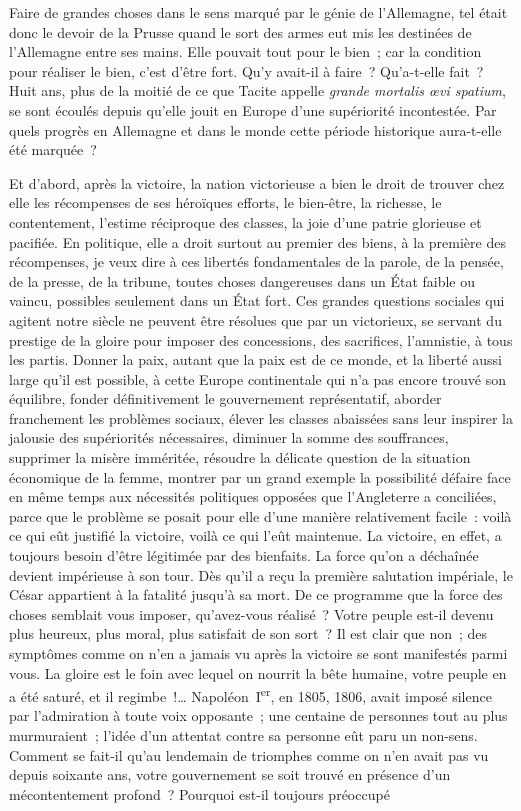 \documentclass[french,twoside]{book} %
\newcommand\orgName[1]{#1}
\newcommand\persName[1]{#1}
\newcommand\placeName[1]{#1}
\begin{document}
Faire de grandes choses dans le sens marqué par le génie de l’{\orgName Allemagne}, tel était donc le devoir de la {\orgName Prusse} quand le sort des armes eut mis les destinées de l’{\orgName Allemagne} entre ses mains. Elle pouvait tout pour le bien ; car la condition pour réaliser le bien, c’est d’être fort. Qu’y avait-il à faire ? Qu’a-t-elle fait ? Huit ans, plus de la moitié de ce que {\persName Tacite} appelle \emph{grande mortalis œvi spatium}, se sont écoulés depuis qu’elle jouit en {\placeName Europe} d’une supériorité incontestée. Par quels progrès en {\placeName Allemagne} et dans le monde cette période historique aura-t-elle été marquée ?\par
Et d’abord, après la victoire, la nation victorieuse a bien le droit de trouver chez elle les récompenses de ses héroïques efforts, le bien-être, la richesse, le contentement, l’estime réciproque des classes, la joie d’une patrie glorieuse et pacifiée. En politique, elle a droit surtout au premier des biens, à la première des récompenses, je veux dire à ces libertés fondamentales de la parole, de la pensée, de la presse, de la tribune, toutes choses dangereuses dans un État faible ou vaincu, possibles seulement dans un État fort. Ces grandes questions sociales qui agitent notre siècle ne peuvent être résolues que par un victorieux, se servant du prestige de la gloire pour imposer des concessions, des sacrifices, l’amnistie, à tous les partis. Donner la paix, autant que la paix est de ce monde, et la liberté aussi large qu’il est possible, à cette Europe continentale qui n’a pas encore trouvé son équilibre, fonder définitivement le gouvernement représentatif, aborder franchement les problèmes sociaux, élever les classes abaissées sans leur inspirer la jalousie des supériorités nécessaires, diminuer la somme des souffrances, supprimer la misère imméritée, résoudre la délicate question de la situation économique de la femme, montrer par un grand exemple la possibilité défaire face en même temps aux nécessités politiques opposées que l’{\orgName Angleterre} a conciliées, parce que le problème se posait pour elle d’une manière relativement facile : voilà ce qui eût justifié la victoire, voilà ce qui l’eût maintenue. La victoire, en effet, a toujours besoin d’être légitimée par des bienfaits. La force qu’on a déchaînée devient impérieuse à son tour. Dès qu’il a reçu la première salutation impériale, le César appartient à la fatalité jusqu’à sa mort. De ce programme que la force des choses semblait vous imposer, qu’avez-vous réalisé ? Votre peuple est-il devenu plus heureux, plus moral, plus satisfait de son sort ? Il est clair que non ; des symptômes comme on n’en a jamais vu après la victoire se sont manifestés parmi vous. La gloire est le foin avec lequel on nourrit la bête humaine, votre peuple en a été saturé, et il regimbe !… {\persName Napoléon I\textsuperscript{er}}, en 1805, 1806, avait imposé silence par l’admiration à toute voix opposante ; une centaine de personnes tout au plus murmuraient ; l’idée d’un attentat contre sa personne eût paru un non-sens. Comment se fait-il qu’au lendemain de triomphes comme on n’en avait pas vu depuis soixante ans, votre gouvernement se soit trouvé en présence d’un mécontentement profond ? Pourquoi est-il toujours préoccupé 
\end{document}
